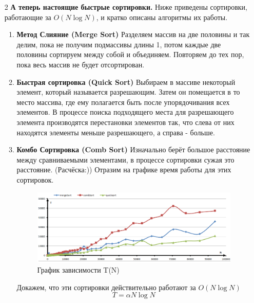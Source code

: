 \documentclass[a4paper, 12pt]{article}
\begin{document}
\begin{enumerate}
    \item[2] \textbf{А теперь настоящие быстрые сортировки.} \newline
    Ниже приведены сортировки, работающие за $O(N\log N)$, и кратко описаны алгоритмы их работы.
    \begin{enumerate}
        \item \textbf{Метод Слияние (Merge Sort)} \newline
        Разделяем массив на две половины и так делим, пока не получим подмассивы длины 1, потом каждые две половины сортируем между собой и объединяем. Повторяем до тех пор, пока весь массив не будет отсортирован.
        \item \textbf{Быстрая сортировка (Quick Sort)} \newline
        Выбираем в массиве некоторый элемент, который называется разрешающим. Затем он помещается в то место массива, где ему полагается быть после упорядочивания всех элементов. В процессе поиска подходящего места для разрешающего элемента производятся перестановки элементов так, что слева от них находятся элементы меньше разрешающего, а справа - больше.
        \item \textbf{Комбо Сортировка (Comb Sort)} \newline
        Изначально берёт большое расстояние между сравниваемыми элементами, в процессе сортировки сужая это расстояние. (Расчёска:)) \newline
        Отразим на графике время работы для этих сортировок. \newline
        \begin{figure}[h!]
            \centering
    		      \includegraphics[scale = 0.55]{4.png}
    		      \caption{График зависимости T(N)}
    		      \label{fig:my_label}
    	\end{figure}
        \[\]
        Докажем, что эти сортировки действительно работают за $O(N\log N)$ \newline
        \begin{equation}
            T = \alpha N \log N

\end{equation}
\end{enumerate}
\end{enumerate}
\end{document}
